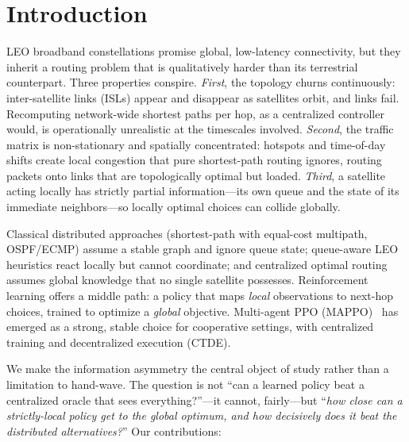 \documentclass[conference,10pt]{IEEEtran}
\begin{document}
\section{Introduction}

LEO broadband constellations promise global, low-latency connectivity, but they inherit a routing problem that is qualitatively harder than its terrestrial counterpart. Three properties conspire. \emph{First}, the topology churns continuously: inter-satellite links (ISLs) appear and disappear as satellites orbit, and links fail. Recomputing network-wide shortest paths per hop, as a centralized controller would, is operationally unrealistic at the timescales involved. \emph{Second}, the traffic matrix is non-stationary and spatially concentrated: hotspots and time-of-day shifts create local congestion that pure shortest-path routing ignores, routing packets onto links that are topologically optimal but loaded. \emph{Third}, a satellite acting locally has strictly partial information---its own queue and the state of its immediate neighbors---so locally optimal choices can collide globally.

Classical distributed approaches (shortest-path with equal-cost multipath, OSPF/ECMP) assume a stable graph and ignore queue state; queue-aware LEO heuristics react locally but cannot coordinate; and centralized optimal routing assumes global knowledge that no single satellite possesses. Reinforcement learning offers a middle path: a policy that maps \emph{local} observations to next-hop choices, trained to optimize a \emph{global} objective. Multi-agent PPO (MAPPO)~\cite{yu2022surprising} has emerged as a strong, stable choice for cooperative settings, with centralized training and decentralized execution (CTDE).

We make the information asymmetry the central object of study rather than a limitation to hand-wave. The question is not ``can a learned policy beat a centralized oracle that sees everything?''---it cannot, fairly---but ``\emph{how close can a strictly-local policy get to the global optimum, and how decisively does it beat the distributed alternatives?}'' Our contributions:
\end{document}
